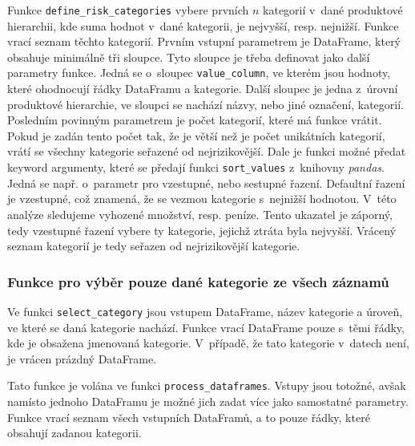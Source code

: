 Funkce \texttt{define\_risk\_categories} vybere prvních $n$ kategorií v~dané produktové hierarchii, kde suma hodnot v~dané kategorii, je nejvyšší, resp. nejnižší. Funkce vrací seznam těchto kategorií. Prvním vstupní parametrem je DataFrame, který obsahuje minimálně tři sloupce. Tyto sloupce je třeba definovat jako další parametry funkce. Jedná se o~sloupec \texttt{value\_column}, ve kterém jsou hodnoty, které ohodnocují řádky DataFramu a kategorie. Další sloupec je jedna z~úrovní produktové hierarchie, ve sloupci se nachází názvy, nebo jiné označení, kategorií. Posledním povinným parametrem je počet kategorií, které má funkce vrátit. Pokud je zadán tento počet tak, že je větší než je počet unikátních kategorií, vrátí se všechny kategorie seřazené od nejrizikovější. Dale je funkci možné předat keyword argumenty, které se předají funkci \texttt{sort\_values} z~knihovny \emph{pandas}. Jedná se např. o~parametr pro vzestupné, nebo sestupné řazení. Defaultní řazení je vzestupné, což znamená, že se vezmou kategorie s~nejnižší hodnotou. V~této analýze sledujeme vyhozené množství, resp. peníze. Tento ukazatel je záporný, tedy vzestupné řazení vybere ty kategorie, jejichž ztráta byla nejvyšší. Vrácený seznam kategorií je tedy seřazen od nejrizikovější kategorie.

\subsubsection*{Funkce pro výběr pouze dané kategorie ze všech záznamů}
Ve funkci \texttt{select\_category} jsou vstupem DataFrame, název kategorie a úroveň, ve které se daná kategorie nachází. Funkce vrací DataFrame pouze s~těmi řádky, kde je obsažena jmenovaná kategorie. V~případě, že tato kategorie v~datech není, je vrácen prázdný DataFrame.

Tato funkce je volána ve funkci \texttt{process\_dataframes}. Vstupy jsou totožné, avšak namísto jednoho DataFramu je možné jich zadat více jako samostatné parametry. 
Funkce vrací seznam všech vstupních DataFramů, a to pouze řádky, které obsahují zadanou kategorii.



